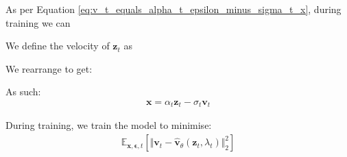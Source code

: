 \documentclass[ oneside,%
                    author={George Herbert},
                    degree={MSci},
                     title={Video Diffusion Models for Climate Simulations},
                  subtitle={}]{dissertation}
\begin{document}
As per Equation \ref{eq:v_t_equals_alpha_t_epsilon_minus_sigma_t_x}, during training we can 



We define the velocity of $\mathbf{z}_t$ as 

We rearrange to get:

As such:
\begin{align}
      \mathbf{x}=\alpha_t\mathbf{z}_t-\sigma_t\mathbf{v}_t
\end{align}

During training, we train the model to minimise:
\begin{align}
      \mathbb{E}_{\mathbf{x},\boldsymbol\epsilon, t}\left[\Vert\mathbf{v}_t-\hat{\mathbf{v}}_\theta(\mathbf{z}_t, \lambda_t)\Vert_2^2\right]
\end{align}

\end{document}
